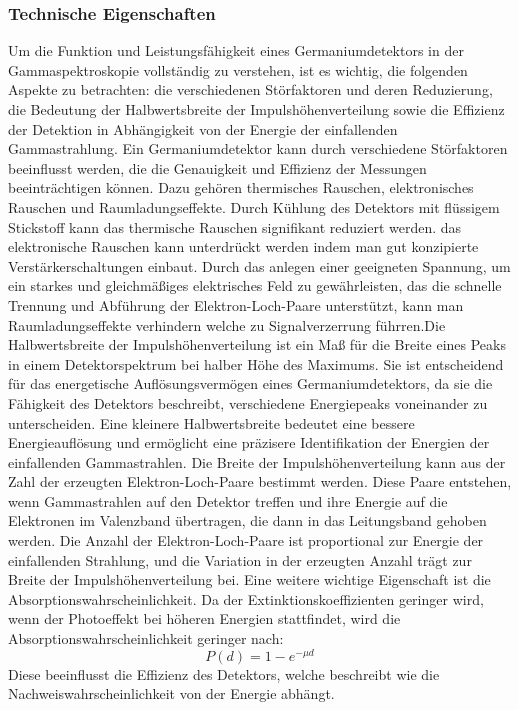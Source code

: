 \subsubsection{Technische Eigenschaften}
Um die Funktion und Leistungsfähigkeit eines Germaniumdetektors in der Gammaspektroskopie vollständig zu verstehen, ist es wichtig, die folgenden Aspekte zu betrachten: 
die verschiedenen Störfaktoren und deren Reduzierung, die Bedeutung der Halbwertsbreite der Impulshöhenverteilung sowie die Effizienz der Detektion in Abhängigkeit von der Energie
der einfallenden Gammastrahlung.
Ein Germaniumdetektor kann durch verschiedene Störfaktoren beeinflusst werden, die die Genauigkeit und Effizienz der Messungen beeinträchtigen können.
Dazu gehören thermisches Rauschen, elektronisches Rauschen und Raumladungseffekte. Durch Kühlung des Detektors mit flüssigem Stickstoff kann das thermische
Rauschen signifikant reduziert werden. das elektronische Rauschen kann unterdrückt werden indem man gut konzipierte Verstärkerschaltungen einbaut. Durch das 
anlegen einer geeigneten Spannung, um ein starkes und gleichmäßiges elektrisches Feld zu gewährleisten, das die schnelle Trennung und Abführung der Elektron-Loch-Paare
unterstützt, kann man Raumladungseffekte verhindern welche zu Signalverzerrung führren.Die Halbwertsbreite der Impulshöhenverteilung ist ein Maß für die Breite eines Peaks 
in einem Detektorspektrum bei halber Höhe des Maximums. Sie ist entscheidend für das energetische Auflösungsvermögen eines Germaniumdetektors, da sie die Fähigkeit des Detektors
beschreibt, verschiedene Energiepeaks voneinander zu unterscheiden. Eine kleinere Halbwertsbreite bedeutet eine bessere Energieauflösung und ermöglicht eine präzisere
Identifikation der Energien der einfallenden Gammastrahlen.
Die Breite der Impulshöhenverteilung kann aus der Zahl der erzeugten Elektron-Loch-Paare bestimmt werden. Diese Paare entstehen, wenn Gammastrahlen auf den Detektor
treffen und ihre Energie auf die Elektronen im Valenzband übertragen, die dann in das Leitungsband gehoben werden. Die Anzahl der Elektron-Loch-Paare ist proportional 
zur Energie der einfallenden Strahlung, und die Variation in der erzeugten Anzahl trägt zur Breite der Impulshöhenverteilung bei.
Eine weitere wichtige Eigenschaft ist die Absorptionswahrscheinlichkeit. Da der Extinktionskoeffizienten geringer wird, wenn der Photoeffekt bei höheren Energien stattfindet,
wird die Absorptionswahrscheinlichkeit geringer nach:
\begin{equation}
    P(d)=1-e^{-\mu d}
    \label{eq:Absorptionswahrscheinlichkeit}
\end{equation}    
Diese beeinflusst die Effizienz des Detektors, welche beschreibt wie die Nachweiswahrscheinlichkeit von der Energie abhängt.


